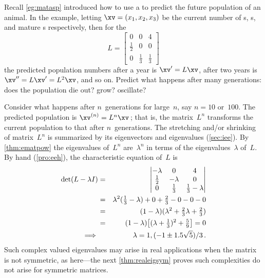 \begin{example} \label{eg:ltas}
Recall \autoref{eg:matasp} introduced how to use a  to predict the future population of an animal.
In the example, letting \(\xv=(x_1,x_2,x_3)\) be the current number of s, s, and mature s respectively, then for the 
\begin{equation*}
L=\begin{bmatrix} 0&0&4\\\frac12&0&0\\0&\frac13&\frac13 \end{bmatrix}
\end{equation*} 
the predicted population numbers after a year is \(\xv'=L\xv\), after two years is \(\xv''=L\xv'=L^2\xv\), and so on.
Predict what happens after many generations: does the population die out? grow? oscillate? 
\begin{solution} 
Consider what happens after \(n\)~generations for large~\(n\), say \(n=10\) or~\(100\).
The predicted population is \(\xv^{(n)}=L^n\xv\)\,; that is, the matrix~\(L^n\) transforms the current population to that after \(n\)~generations.
The stretching and/or shrinking of matrix~\(L^n\) is summarized by its eigenvectors and eigenvalues (\autoref{sec:iee}).
By \autoref{thm:ematpow} the eigenvalues of~\(L^n\) are~\(\lambda^n\) in terms of the eigenvalues~\(\lambda\) of~\(L\).
By hand (\autoref{pro:eeh}), the characteristic equation of~\(L\) is
\begin{eqnarray*}
\det(L-\lambda I)
&=&\begin{vmatrix} -\lambda&0&4\\\frac12&-\lambda&0\\0&\frac13&\frac13-\lambda \end{vmatrix}
\\&=&\lambda^2(\tfrac13-\lambda)+0+\tfrac23-0-0-0
\\&=&(1-\lambda)(\lambda^2 +\tfrac23\lambda+\tfrac23)
\\&=&(1-\lambda)\big[(\lambda+\tfrac13)^2+\tfrac59\big]=0
\\\implies&&\lambda=1,(-1\pm 1.5\sqrt5)/3\,.
\end{eqnarray*}
Such complex valued eigenvalues may arise in real applications when the matrix is not symmetric, as here---the next \autoref{thm:realeigsym} proves such complexities do not arise for symmetric matrices.


\end{solution}
\end{example}
